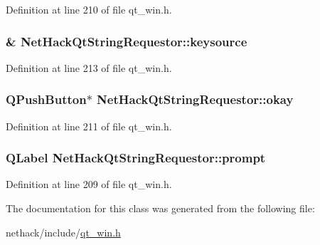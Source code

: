 Definition at line 210 of file qt\+\_\+win.\+h.

\hypertarget{classNetHackQtStringRequestor_a2932413b5a1218abaee4010fb8ff2865}{
\subsubsection[{keysource}]{\& Net\+Hack\+Qt\+String\+Requestor\+::keysource\hspace{0.3cm}{\ttfamily [private]}}}\label{classNetHackQtStringRequestor_a2932413b5a1218abaee4010fb8ff2865}


Definition at line 213 of file qt\+\_\+win.\+h.

\hypertarget{classNetHackQtStringRequestor_a07c62b711f1a88ec515cb2950ee50f10}{
\subsubsection[{okay}]{\setlength{\rightskip}{0pt plus 5cm}Q\+Push\+Button$\ast$ Net\+Hack\+Qt\+String\+Requestor\+::okay\hspace{0.3cm}{\ttfamily [private]}}}\label{classNetHackQtStringRequestor_a07c62b711f1a88ec515cb2950ee50f10}


Definition at line 211 of file qt\+\_\+win.\+h.

\hypertarget{classNetHackQtStringRequestor_a74af01c455bbf9cbe1da8c59cd4b8bba}{
\subsubsection[{prompt}]{\setlength{\rightskip}{0pt plus 5cm}Q\+Label Net\+Hack\+Qt\+String\+Requestor\+::prompt\hspace{0.3cm}{\ttfamily [private]}}}\label{classNetHackQtStringRequestor_a74af01c455bbf9cbe1da8c59cd4b8bba}


Definition at line 209 of file qt\+\_\+win.\+h.



The documentation for this class was generated from the following file\+:\begin{DoxyCompactItemize}
\item 
nethack/include/\hyperlink{qt__win_8h}{qt\+\_\+win.\+h}\end{DoxyCompactItemize}
